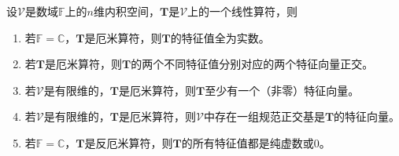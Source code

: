 \documentclass[main.tex]{subfiles}
\begin{document}
\begin{theorem}\label{thm:II.2.32}
    设$\mathcal{V}$是数域$\mathbb{F}$上的$n$维内积空间，$\mathbf{T}$是$\mathcal{V}$上的一个线性算符，则
    \begin{enumerate}
        \item 若$\mathbb{F}=\mathbb{C}$，$\mathbf{T}$是厄米算符，则$\mathbf{T}$的特征值全为实数。
        \item 若$\mathbf{T}$是厄米算符，则$\mathbf{T}$的两个不同特征值分别对应的两个特征向量正交。
        \item 若$\mathcal{V}$是有限维的，$\mathbf{T}$是厄米算符，则$\mathbf{T}$至少有一个（非零）特征向量。
        \item 若$\mathcal{V}$是有限维的，$\mathbf{T}$是厄米算符，则$\mathcal{V}$中存在一组规范正交基是$\mathbf{T}$的特征向量。
        \item 若$\mathbb{F}=\mathbb{C}$，$\mathbf{T}$是反厄米算符，则$\mathbf{T}$的所有特征值都是纯虚数或0。
    \end{enumerate}
\end{theorem}
\end{document}
